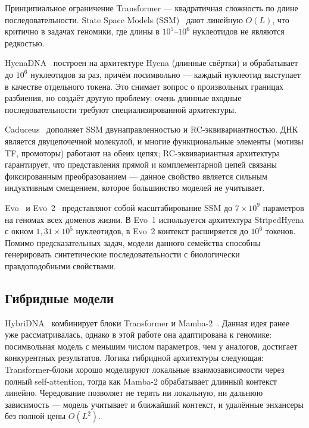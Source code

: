 Принципиальное ограничение Transformer --- квадратичная сложность по
длине последовательности. State Space Models
(SSM)~\cite{guMambaLinearTimeSequence2023} дают линейную $O(L)$, что критично
в задачах геномики, где длины в $10^5$--$10^6$ нуклеотидов не
являются редкостью.

HyenaDNA~\cite{nguenHyenaDNALongRangeGenomic2024} построен на
архитектуре Hyena (длинные свёртки) и обрабатывает до $10^6$
нуклеотидов за раз, причём посимвольно --- каждый нуклеотид выступает
в качестве отдельного
токена. Это снимает вопрос о произвольных границах разбиения, но
создаёт другую проблему: очень длинные входные последовательности
требуют специализированной архитектуры.

Caduceus~\cite{schiffCaduceusBiDirectionalEquivariant2024} дополняет
SSM двунаправленностью и RC-эквивариантностью. ДНК является
двуцепочечной молекулой, и многие функциональные элементы (мотивы TF,
промоторы) работают на обеих цепях; RC-эквивариантная архитектура
гарантирует, что представления прямой и комплементарной цепей связаны
фиксированным преобразованием --- данное свойство является сильным
индуктивным смещением, которое большинство моделей не учитывает.

Evo~\cite{nguyenSequenceModelingDesign2024} и
Evo~2~\cite{nguyenEvo2GenomeModeling2026} представляют собой
масштабирование SSM до $7 \times 10^9$ параметров на геномах всех
доменов жизни. В Evo~1 используется архитектура StripedHyena с окном
$1{,}31 \times 10^5$ нуклеотидов, в Evo~2 контекст расширяется до
$10^6$ токенов. Помимо предсказательных задач, модели данного
семейства способны генерировать синтетические последовательности с
биологически правдоподобными свойствами.

\subsection{Гибридные модели}

HybriDNA~\cite{maHybriDNAHybridTransformerMamba22025} комбинирует
блоки Transformer и Mamba-2~\cite{daoTransformersAreSSMs2024}. Данная
идея ранее уже рассматривалась, однако в этой работе она адаптирована
к геномике: посимвольная модель с меньшим числом параметров, чем у
аналогов, достигает конкурентных результатов. Логика гибридной
архитектуры следующая: Transformer-блоки
хорошо моделируют локальные взаимозависимости через полный self-attention,
тогда как Mamba-2 обрабатывает длинный контекст линейно. Чередование позволяет
не терять ни локальную, ни дальнюю зависимость --- модель учитывает
и ближайший контекст, и удалённые энхансеры без полной цены $O(L^2)$.

